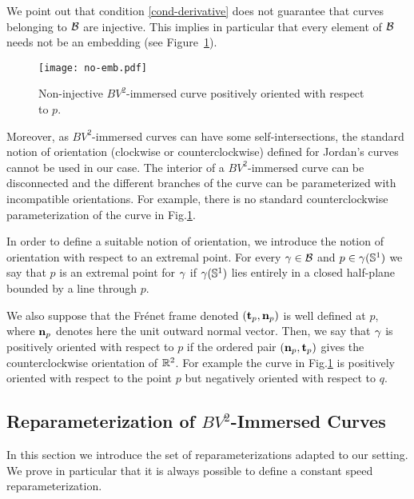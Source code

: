 \begin{rem}\label{properties}

We point out that condition \eqref{cond-derivative} does not guarantee that curves belonging to  $\mathcal{B}$ are injective. 
This implies in particular that every element of  $\mathcal{B}$ needs not  be  an embedding (see Figure~\ref{not-emb}).

\begin{figure}[h!]
\centering
\texttt{[image: no-emb.pdf]}
%
\caption{\label{not-emb} Non-injective $BV^2$-immersed curve positively oriented with respect to $p$.}
\end{figure}




Moreover, as $BV^2$-immersed curves can have some self-intersections,  the standard notion of orientation (clockwise or counterclockwise) defined for Jordan's curves cannot be used in our case. The interior of a $BV^2$-immersed curve can be disconnected and the different branches of the curve can be parameterized with incompatible orientations. For example, there is no  standard counterclockwise parameterization of the curve in Fig.\ref{not-emb}.

In order to define a suitable notion of orientation, we introduce the notion of orientation with respect to an extremal point. For every $\gamma\in \mathcal{B}$ and $p\in \gamma(\mathbb{S}^1)$ we say that $p$ is an extremal point for $\gamma$ if $\gamma(\mathbb{S}^1)$ lies  entirely in a closed half-plane bounded by a line
through $p$. 

We also suppose that the Fr\'{e}net frame denoted $({\bf t}_p, {\bf n}_p)$ is well defined at $p$, where ${\bf n}_p$ denotes here the unit outward normal vector. Then, we say that $\gamma$ is positively oriented with respect to $p$ if  the ordered pair $({\bf n}_p, {\bf t}_p)$ gives the
counterclockwise orientation of ${\mathbb R}^2$. 
For example the curve in  Fig.\ref{not-emb} is positively oriented with respect to the point $p$ but negatively oriented with respect to $q$.

\end{rem}


\subsection{Reparameterization of $BV^2$-Immersed Curves}\label{repa}

In this section we introduce the set of reparameterizations adapted to  our setting. We prove in particular that it is always possible to define a constant speed reparameterization.

